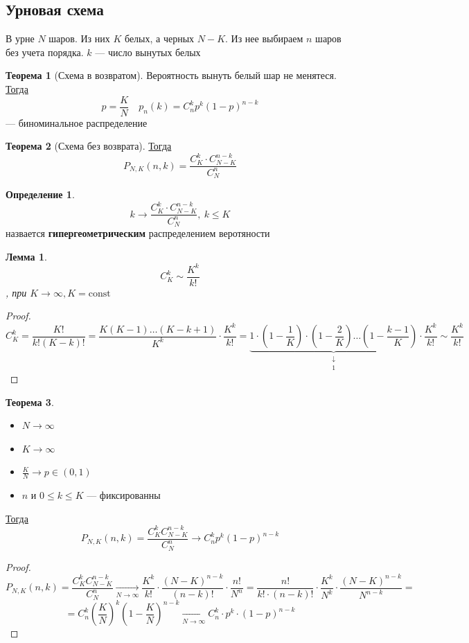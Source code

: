 \documentclass[oneside]{book}
\newcommand{\const}{\text{const}}
\theoremstyle{plain}
\newtheorem{lemma}{Лемма}
\theoremstyle{remark}
\theoremstyle{definition}
\newtheorem{theorem}{Теорема}[section]
\newtheorem*{definition}{Определение}
\begin{document}
\subsection{Урновая схема}
\label{sec:org6bba4f2}
В урне \(N\) шаров. Из них \(K\) белых, а черных \(N - K\). Из нее выбираем \(n\) шаров без учета порядка. \(k\) --- число вынутых белых
\begin{theorem}[Схема в возвратом]
Вероятность вынуть белый шар не менятеся. \\
\uline{Тогда} \[ p = \frac{K}{N}\quad p_n(k) = C^k_np^k(1 - p)^{n - k} \]
--- биноминальное распределение
\end{theorem}
\begin{theorem}[Схема без возврата]
\uline{Тогда} \[ P_{N,K}(n, k) = \frac{C^k_K\cdot C^{n-k}_{N - K}}{C^n_N} \]
\end{theorem}
\begin{definition}
\[ k \to \frac{C^k_K\cdot C^{n - k}_{N - K}}{C^n_N},\ k \le K \]
назвается \textbf{гипергеометрическим} распределением веротяности
\end{definition}
\begin{lemma}
\[ C^k_K \sim \frac{K^k}{k!} \]
, при \(K \to \infty, K = \const\)
\end{lemma}
\begin{proof}
\[ C^k_K = \frac{K!}{k!(K - k)!} = \frac{K(K - 1)\dots(K - k + 1)}{K^k}\cdot \frac{K^k}{k!} = \underbrace{1 \cdot \left(1 - \frac{1}{K}\right)\cdot\left(1 - \frac{2}{K}\right) \dots \left(1 - \frac{k - 1}{K}\right)}_{\substack{\downarrow \\ 1}} \cdot\frac{K^k}{k!} \sim \frac{K^k}{k!}\]
\end{proof}
\begin{theorem}
\-
\begin{itemize}
\item \(N \to \infty\)
\item \(K \to \infty\)
\item \(\frac{K}{N} \to p \in (0, 1)\)
\item \(n\) и \(0 \le k \le K\) --- фиксированны
\end{itemize}
\uline{Тогда} \[ P_{N,K}(n,k) = \frac{C^k_KC^{n - k}_{N - K}}{C^n_N} \to C^k_np^k(1 - p)^{n - k} \]
\end{theorem}
\begin{proof}
\[ P_{N, K}(n, k) = \frac{C^k_KC^{n - k}_{N - K}}{C^n_N} \xrightarrow[N \to \infty]{} \frac{K^k}{k!}\cdot \frac{(N -K)^{n - k}}{(n - k)!}\cdot \frac{n!}{N^n} = \frac{n!}{k!\cdot(n- k)!}\cdot \frac{K^k}{N^k}\cdot\frac{(N - K)^{n - k}}{N^{n - k}} = \]
\[ = C^k_n\left(\frac{K}{N}\right)^k\left(1 - \frac{K}{N}\right)^{n -k} \xrightarrow[N \to \infty]{} C^k_n\cdot p^k \cdot ( 1- p)^{n - k}\]
\end{proof}
\end{document}
